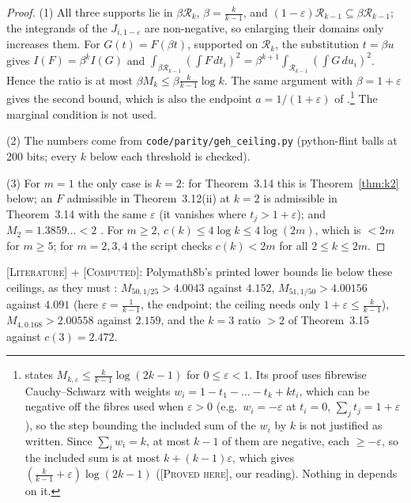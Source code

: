 \documentclass[11pt]{amsart}
\theoremstyle{definition}
\theoremstyle{remark}
\newcommand{\lbl}[1]{\textup{\textsc{[#1]}}}
\begin{document}
\begin{proof}
(1) All three supports lie in $\beta\mathcal R_k$, $\beta=\frac k{k-1}$, and
$(1-\varepsilon)\mathcal R_{k-1}\subseteq \beta\mathcal R_{k-1}$; the integrands of
the $J_{i,1-\varepsilon}$ are non-negative, so enlarging their domains only
increases them. For $G(t)=F(\beta t)$, supported on $\mathcal R_k$, the substitution
$t=\beta u$ gives $I(F)=\beta^kI(G)$ and $\int_{\beta\mathcal R_{k-1}}(\int F\,dt_i)^2=\beta^{k+1}
\int_{\mathcal R_{k-1}}(\int G\,du_i)^2$. Hence the ratio is at most
$\beta M_k\le\beta\frac k{k-1}\log k$. The same argument with $\beta=1+\varepsilon$ gives the
second bound, which is also the endpoint $a=1/(1+\varepsilon)$ of
\cite[Remark~6.6, p.~45]{PM8b}.\footnote{\cite[Proposition~6.5, p.~44]{PM8b}
states $M_{k,\varepsilon}\le\frac k{k-1}\log(2k-1)$ for $0\le\varepsilon<1$. Its proof
uses fibrewise Cauchy--Schwarz with weights $w_i=1-t_1-\dots-t_k+kt_i$, which
can be negative off the fibres used when $\varepsilon>0$ (e.g.\ $w_i=-\varepsilon$ at
$t_i=0$, $\sum_jt_j=1+\varepsilon$), so the step bounding the included sum of the $w_i$
by $k$ is not justified as written. Since $\sum_iw_i=k$, at most $k-1$ of them are
negative, each $\ge-\varepsilon$, so the included sum is at most $k+(k-1)\varepsilon$, which gives
$\left(\frac k{k-1}+\varepsilon\right)\log(2k-1)$ (\lbl{Proved here}, our reading).
Nothing in \cite{PM8b} depends on it.} The marginal condition is not used.

(2) The numbers come from \texttt{code/}\allowbreak\texttt{parity/}\allowbreak\texttt{geh\_ceiling.py}
(python-flint balls at 200 bits; every $k$ below each threshold is checked).

(3) For $m=1$ the only case is $k=2$: for Theorem~3.14 this is
Theorem~\ref{thm:k2} below; an $F$ admissible in Theorem~3.12(ii) at $k=2$ is
admissible in Theorem~3.14 with the same $\varepsilon$ (it vanishes where
$t_j>1+\varepsilon$); and $M_2=1.3859\ldots<2$ \cite[Corollary~6.3, p.~43]{PM8b}.
For $m\ge2$, $c(k)\le4\log k\le4\log(2m)$, which is $<2m$ for $m\ge5$; for
$m=2,3,4$ the script checks $c(k)<2m$ for all $2\le k\le2m$.
\end{proof}

\lbl{Literature} + \lbl{Computed}: Polymath8b's printed lower bounds lie below these ceilings, as they must
\cite[Theorems~3.13, 3.15]{PM8b}: $M_{50,1/25}>4.0043$ against $4.152$,
$M_{51,1/50}>4.00156$ against $4.091$ (here $\varepsilon=\frac1{k-1}$, the endpoint;
the ceiling needs only $1+\varepsilon\le\frac k{k-1}$), $M_{4,0.168}>2.00558$ against $2.159$, and
the $k=3$ ratio $>2$ of Theorem~3.15 against $c(3)=2.472$.
\end{document}
